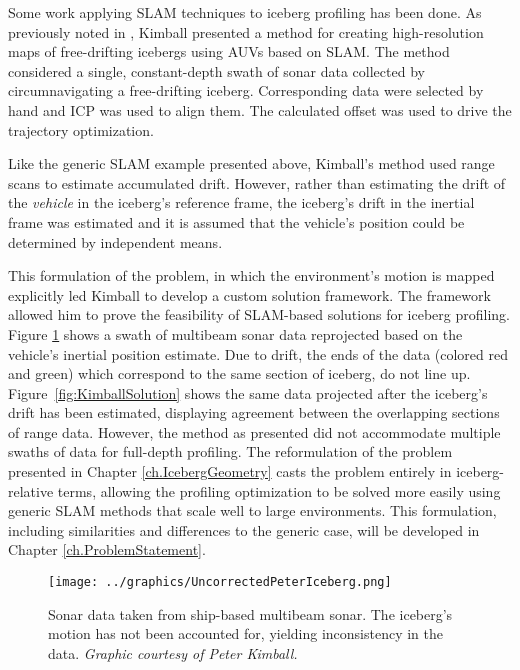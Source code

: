 Some work applying SLAM techniques to iceberg profiling has been done. As previously noted in \cite{Kimball2011b}, Kimball presented a method for creating high-resolution maps of free-drifting icebergs using AUVs based on SLAM. The method considered a single, constant-depth swath of sonar data collected by circumnavigating a free-drifting iceberg. Corresponding data were selected by hand and ICP was used to align them. The calculated offset was used to drive the trajectory optimization.

Like the generic SLAM example presented above, Kimball's method used range scans to estimate accumulated drift. However, rather than estimating the drift of the \emph{vehicle} in the iceberg's reference frame, the iceberg's drift in the inertial frame was estimated and it is assumed that the vehicle's position could be determined by independent means.  

This formulation of the problem, in which the environment's motion is mapped explicitly led Kimball to develop a custom solution framework. The framework allowed him to prove the feasibility of SLAM-based solutions for iceberg profiling. Figure \ref{fig:KimballPreSolution} shows a swath of multibeam sonar data reprojected based on the vehicle's inertial position estimate. Due to drift, the ends of the data (colored red and green) which correspond to the same section of iceberg, do not line up. Figure~\ref{fig:KimballSolution} shows the same data projected after the iceberg's drift has been estimated, displaying agreement between the overlapping sections of range data. However, the method as presented did not accommodate multiple swaths of data for full-depth profiling. The reformulation of the problem presented in Chapter \ref{ch.IcebergGeometry} casts the problem entirely in iceberg-relative terms, allowing the profiling optimization to be solved more easily using generic SLAM methods that scale well to large environments. This formulation, including similarities and differences to the generic case, will be developed in Chapter \ref{ch.ProblemStatement}.

 \begin{figure}[!htb]
   \centering
   \texttt{[image: ../graphics/UncorrectedPeterIceberg.png]} %
   \caption{Sonar data taken from ship-based multibeam sonar. The iceberg's motion has not been accounted for, yielding inconsistency in the data. \emph{Graphic courtesy of Peter Kimball.}}
   \label{fig:KimballPreSolution}
\end{figure}

